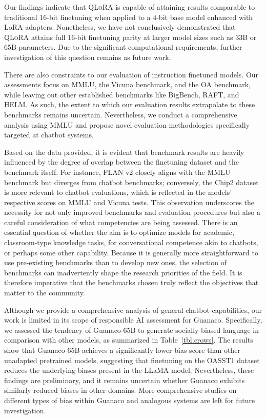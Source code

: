 Our findings indicate that \textsc{QLoRA} is capable of attaining results comparable to traditional 16-bit finetuning when applied to a 4-bit base model enhanced with LoRA adapters. Nonetheless, we have not conclusively demonstrated that \textsc{QLoRA} attains full 16-bit finetuning parity at larger model sizes such as 33B or 65B parameters. Due to the significant computational requirements, further investigation of this question remains as future work.

There are also constraints to our evaluation of instruction finetuned models. Our assessments focus on MMLU, the Vicuna benchmark, and the OA benchmark, while leaving out other established benchmarks like BigBench, RAFT, and HELM. As such, the extent to which our evaluation results extrapolate to these benchmarks remains uncertain. Nevertheless, we conduct a comprehensive analysis using MMLU and propose novel evaluation methodologies specifically targeted at chatbot systems.

Based on the data provided, it is evident that benchmark results are heavily influenced by the degree of overlap between the finetuning dataset and the benchmark itself. For instance, FLAN v2 closely aligns with the MMLU benchmark but diverges from chatbot benchmarks; conversely, the Chip2 dataset is more relevant to chatbot evaluations, which is reflected in the models’ respective scores on MMLU and Vicuna tests. This observation underscores the necessity for not only improved benchmarks and evaluation procedures but also a careful consideration of what competencies are being assessed. There is an essential question of whether the aim is to optimize models for academic, classroom-type knowledge tasks, for conversational competence akin to chatbots, or perhaps some other capability. Because it is generally more straightforward to use pre-existing benchmarks than to develop new ones, the selection of benchmarks can inadvertently shape the research priorities of the field. It is therefore imperative that the benchmarks chosen truly reflect the objectives that matter to the community.

Although we provide a comprehensive analysis of general chatbot capabilities, our work is limited in its scope of responsible AI assessment for {Guanaco}. Specifically, we assessed the tendency of {Guanaco}-65B to generate socially biased language in comparison with other models, as summarized in Table~\ref{tbl:crows}. The results show that {Guanaco}-65B achieves a significantly lower bias score than other unadapted pretrained models, suggesting that finetuning on the OASST1 dataset reduces the underlying biases present in the LLaMA model. Nevertheless, these findings are preliminary, and it remains uncertain whether {Guanaco} exhibits similarly reduced biases in other domains. More comprehensive studies on different types of bias within {Guanaco} and analogous systems are left for future investigation.

